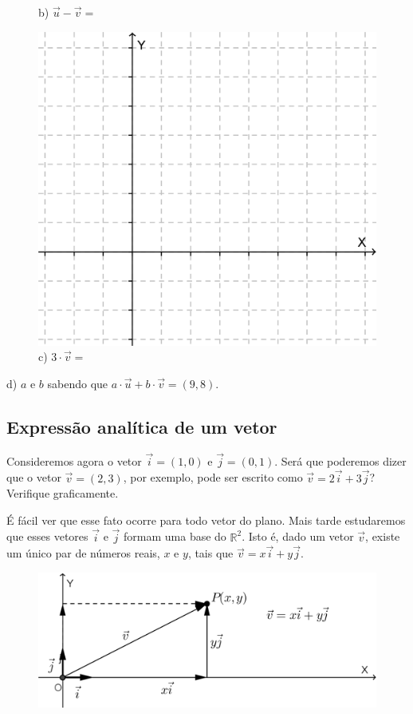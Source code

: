 \begin{exemplo}
\begin{figure}[H]
\begin{minipage}[b]{0.3\linewidth}
\caption{b) $\vec{u}-\vec{v}=$}
\end{minipage}\hfill
\begin{minipage}[b]{0.3\linewidth}
\includegraphics[width=\linewidth]{analitica/imagens/malha.png}
\caption{c) $3\cdot \vec{v}=$}
\end{minipage}
\end{figure}

d) $a$ e $b$ sabendo que $a\cdot \vec{u}+b\cdot \vec{v}=(9, 8)$.
\end{exemplo}
\vspace{2cm}

\subsection{Expressão analítica de um vetor}

Consideremos agora o vetor $\vec{i}=(1,0)$ e $\vec{j}=(0,1)$. Será que poderemos dizer que o vetor $\vec{v}=(2,3)$, por exemplo, pode ser escrito como $\vec{v}=2\vec{i}+3\vec{j}$? Verifique graficamente.

É fácil ver que esse fato ocorre para todo vetor do plano. Mais tarde estudaremos que esses vetores $\vec{i}$ e $\vec{j}$ formam uma base do $\mathbb{R}^2$. Isto é, dado um vetor $\vec{v}$, existe um único par de números reais, $x$ e $y$, tais que $\vec{v}=x\vec{i}+y\vec{j}$.

\begin{figure}[H]
\centering
\includegraphics[scale=0.82]{analitica/imagens/combinalinear.png}
\end{figure}

